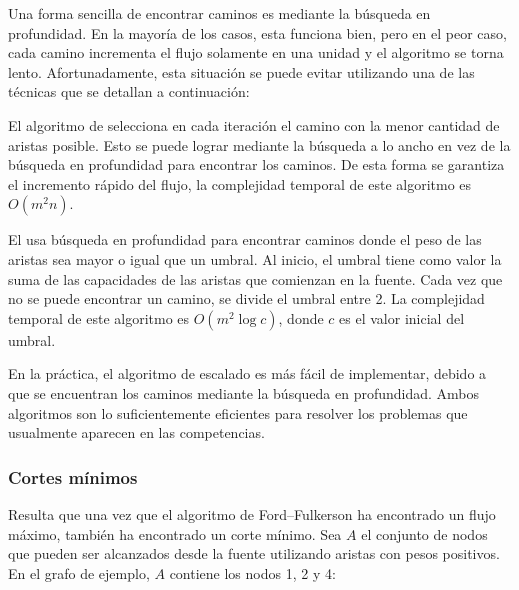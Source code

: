 Una forma sencilla de encontrar caminos es mediante la b\'usqueda en profundidad.
En la mayor\'ia de los casos, esta funciona bien, pero en el peor caso,
cada camino incrementa el flujo solamente en una unidad
y el algoritmo se torna lento.
Afortunadamente, esta situaci\'on se puede evitar
utilizando una de las t\'ecnicas que se detallan a continuaci\'on:


El algoritmo de  \cite{edm72}
selecciona en cada iteraci\'on el camino
con la menor cantidad de aristas posible.
Esto se puede lograr mediante la b\'usqueda a lo ancho
en vez de la b\'usqueda en profundidad para encontrar los caminos.
De esta forma se garantiza el incremento
r\'apido del flujo, la complejidad temporal de
este algoritmo es $O(m^2 n)$.


El  \cite{ahu91} usa b\'usqueda en profundidad
para encontrar caminos donde el peso de las aristas
sea mayor o igual que un umbral.
Al inicio, el umbral tiene como valor
la suma de las capacidades de las aristas
que comienzan en la fuente.
Cada vez que no se puede encontrar un camino,
se divide el umbral entre 2.
La complejidad temporal de este algoritmo es $O(m^2 \log c)$,
donde $c$ es el valor inicial del umbral.

En la pr\'actica, el algoritmo de escalado es m\'as f\'acil de implementar,
debido a que se encuentran los caminos mediante la b\'usqueda en profundidad.
Ambos algoritmos son lo suficientemente eficientes
para resolver los problemas que usualmente aparecen en las competencias.

\subsubsection{Cortes m\'inimos}


Resulta que una vez que el algoritmo de Ford–Fulkerson
ha encontrado un flujo m\'aximo,
tambi\'en ha encontrado un corte m\'inimo.
Sea $A$ el conjunto de nodos
que pueden ser alcanzados desde la fuente
utilizando aristas con pesos positivos.
En el grafo de ejemplo, $A$ contiene los nodos 1, 2 y 4:


